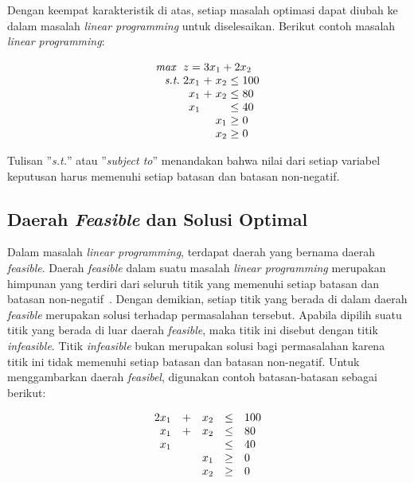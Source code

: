 Dengan keempat karakteristik di atas, setiap masalah optimasi dapat diubah ke dalam masalah \textit{linear programming} untuk diselesaikan. Berikut contoh masalah \textit{linear programming}:

\begin{equation}
	\setlength\arraycolsep{1.5pt}
	\begin{array}{r r c r c l}
		\textit{max } &\multicolumn{5}{l}{z = 3x_1 + 2x_2}\\
		\textit{s.t.} &2x_1 &+ &x_2 &\leq &100\\
		&x_1 &+ &x_2 &\leq &80\\
		&x_1 &&&\leq &40\\
		&&&x_1 &\geq &0\\
		&&&x_2 &\geq &0\\
	\end{array}
\end{equation}

	Tulisan ''\textit{s.t.}'' atau ''\textit{subject to}'' menandakan bahwa nilai dari setiap variabel keputusan harus memenuhi setiap batasan dan batasan non-negatif.

\subsection{Daerah \textit{Feasible} dan Solusi Optimal}
Dalam masalah \textit{linear programming}, terdapat daerah yang bernama daerah \textit{feasible}. Daerah \textit{feasible} dalam suatu masalah \textit{linear programming} merupakan himpunan yang terdiri dari seluruh titik yang memenuhi setiap batasan dan batasan non-negatif~\cite{winston2004operations}. Dengan demikian, setiap titik yang berada di dalam daerah \textit{feasible} merupakan solusi terhadap permasalahan tersebut. Apabila dipilih suatu titik yang berada di luar daerah \textit{feasible}, maka titik ini disebut dengan titik \textit{infeasible}. Titik \textit{infeasible} bukan merupakan solusi bagi permasalahan karena titik ini tidak memenuhi setiap batasan dan batasan non-negatif. Untuk menggambarkan daerah \textit{feasibel}, digunakan contoh batasan-batasan sebagai berikut:

\begin{equation}
	\begin{array}{r c r c l}		
		2x_1 &+ &x_2 &\leq &100\\
		x_1 &+ &x_2 &\leq &80\\
		x_1 &&&\leq &40\\
		&&x_1 &\geq &0\\
		&&x_2 &\geq &0\\
	\end{array}
\end{equation}

